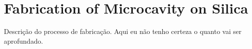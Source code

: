 \chapter{Fabrication of Microcavity on Silica}

Descrição do processo de fabricação. Aqui eu não tenho certeza o quanto vai ser aprofundado.  
